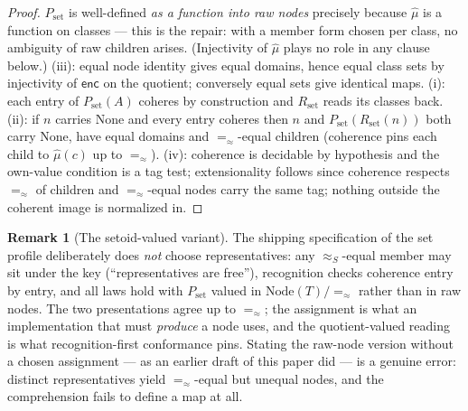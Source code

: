 \documentclass[11pt]{article}
\theoremstyle{definition}
\newtheorem{remark}[theorem]{Remark}
\newcommand{\NodeT}[1]{\mathrm{Node}(#1)}
\newcommand{\eqS}{=_{\approx}}                     %
\newcommand{\enc}{\mathsf{enc}}
\begin{document}
\begin{proof}
$P_{\mathrm{set}}$ is well-defined \emph{as a function into raw nodes} precisely
because $\hat\mu$ is a function on classes --- this is the repair: with a member form
chosen per class, no ambiguity of raw children arises. (Injectivity of $\hat\mu$
plays no role in any clause below.) (iii): equal node identity gives equal
domains, hence equal class sets by injectivity of $\enc$ on the quotient; conversely
equal sets give identical maps. (i): each entry of $P_{\mathrm{set}}(A)$ coheres by
construction and $R_{\mathrm{set}}$ reads its classes back. (ii): if $n$ carries $\mathrm{None}$ and every
entry coheres then $n$ and $P_{\mathrm{set}}(R_{\mathrm{set}}(n))$ both carry $\mathrm{None}$,
have equal domains and $\eqS$-equal children (coherence pins each child to $\hat\mu(c)$ up to $\eqS$).
(iv): coherence is decidable by hypothesis and the own-value condition is a tag test;
extensionality follows since coherence respects $\eqS$ of children and $\eqS$-equal
nodes carry the same tag; nothing outside the coherent image is normalized in.
\end{proof}

\begin{remark}[The setoid-valued variant]
The shipping specification of the set profile deliberately does \emph{not} choose
representatives: any $\approx_S$-equal member may sit under the key
(``representatives are free''), recognition checks coherence entry by entry, and all
laws hold with $P_{\mathrm{set}}$ valued in $\NodeT{T}/\!\eqS$ rather than in raw
nodes. The two presentations agree up to $\eqS$; the assignment is what an implementation
that must \emph{produce} a node uses, and the quotient-valued reading is what
recognition-first conformance pins. Stating the raw-node version without a chosen
assignment --- as an earlier draft of this paper did --- is a genuine error: distinct
representatives yield $\eqS$-equal but unequal nodes, and the comprehension fails to
define a map at all.
\end{remark}
\end{document}
